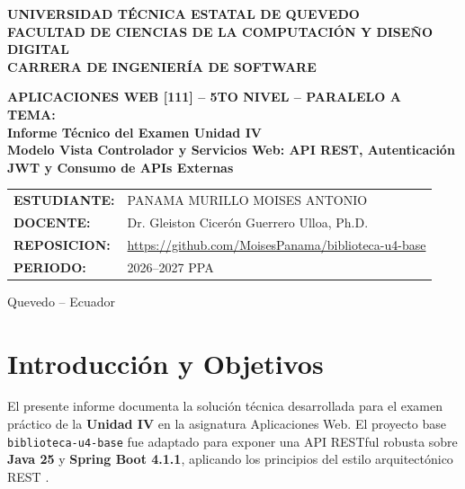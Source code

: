 \documentclass[11pt,a4paper]{article}
\begin{document}
\begin{titlepage}
  \centering
  \vspace*{0.5cm}
  {\Large \textbf{UNIVERSIDAD TÉCNICA ESTATAL DE QUEVEDO}}\\[0.3cm]
  {\large \textbf{FACULTAD DE CIENCIAS DE LA COMPUTACIÓN Y DISEÑO DIGITAL}}\\[0.2cm]
  {\large \textbf{CARRERA DE INGENIERÍA DE SOFTWARE}}

  \vspace{1.0cm}

  {\small \textbf{APLICACIONES WEB [111] -- 5TO NIVEL -- PARALELO A}}\\[0.3cm]

  {\small \textbf{TEMA:}}\\[0.3cm]
  {\LARGE \textbf{Informe Técnico del Examen Unidad IV}}\\[0.2cm]
  {\large \textbf{Modelo Vista Controlador y Servicios Web: API REST, Autenticación JWT y Consumo de APIs Externas}}

  \vspace{1.2cm}

  \begin{tabular}{ll}
    \textbf{ESTUDIANTE:} & PANAMA MURILLO MOISES ANTONIO \\
    \textbf{DOCENTE:}    & Dr. Gleiston Cicerón Guerrero Ulloa, Ph.D. \\
    \textbf{REPOSICION:} & \url{https://github.com/MoisesPanama/biblioteca-u4-base} \\
    \textbf{PERIODO:}    & 2026--2027 PPA
  \end{tabular}

  \vfill
  {\normalsize Quevedo -- Ecuador }
\end{titlepage}

\tableofcontents
\newpage

\section{Introducción y Objetivos}

El presente informe documenta la solución técnica desarrollada para el examen práctico de la \textbf{Unidad IV} en la asignatura Aplicaciones Web. El proyecto base \texttt{biblioteca-u4-base} fue adaptado para exponer una API RESTful robusta sobre \textbf{Java 25} y \textbf{Spring Boot 4.1.1}, aplicando los principios del estilo arquitectónico REST \cite{fielding2002principled}.
\end{document}
